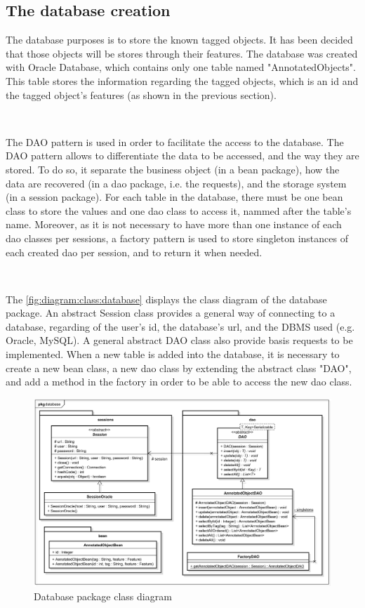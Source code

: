 \subsection{The database creation}

The database purposes is to store the known tagged objects. It has been decided that those objects will be stores through their features. The database was created with Oracle Database, which contains only one table named "AnnotatedObjects". This table stores the information regarding the tagged objects, which is an id and the tagged object's features (as shown in the previous section).

~~

The \gls{DAO} pattern is used in order to facilitate the access to the database. The \gls{DAO} pattern allows to differentiate the data to be accessed, and the way they are stored. To do so, it separate the business object (in a bean package), how the data are recovered (in a dao package, i.e. the requests), and the storage system (in a session package). For each table in the database, there must be one bean class to store the values and one dao class to access it, nammed after the table's name. Moreover, as it is not necessary to have more than one instance of each dao classes per sessions, a factory pattern is used to store singleton instances of each created dao per session, and to return it when needed.

~~


The \vref{fig:diagram:class:database} displays the class diagram of the database package. An abstract Session class provides a general way of connecting to a database, regarding of the user's id, the database's url, and the \gls{DBMS} used (e.g. Oracle, MySQL). A general abstract DAO class also provide basis requests to be implemented. When a new table is added into the database, it is necessary to create a new bean class, a new dao class by extending the abstract class "DAO", and add a method in the factory in order to be able to access the new dao class.


\begin{figure}[h]
	\centering 
	\includegraphics[width=1\textwidth]{images/diagrams/class_diagram_database}
	\caption{Database package class diagram}
	\label{fig:diagram:class:database}
\end{figure}


